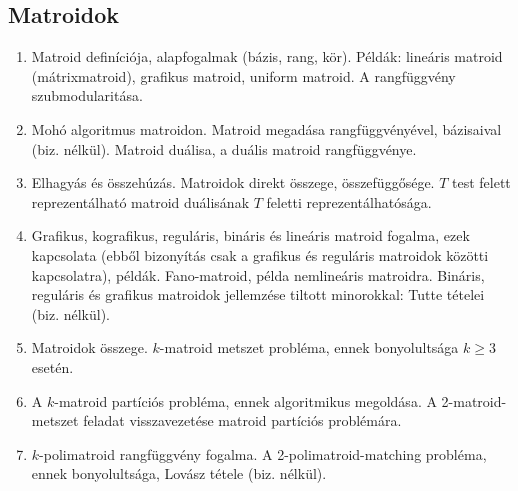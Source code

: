 \subsection*{Matroidok}
\begin{enumerate}[resume]
\item	Matroid definíciója, alapfogalmak (bázis, rang, kör). Példák: lineáris matroid (mátrixmatroid), grafikus matroid, uniform matroid. A rangfüggvény szubmodularitása.
\item	Mohó algoritmus matroidon. Matroid megadása rangfüggvényével, bázisaival (biz. nélkül). Matroid duálisa, a duális matroid rangfüggvénye.
\item	Elhagyás és összehúzás. Matroidok direkt összege, összefüggősége. $T$ test felett reprezentálható matroid duálisának $T$ feletti reprezentálhatósága.
\item	Grafikus, kografikus, reguláris, bináris és lineáris matroid fogalma, ezek kapcsolata (ebből bizonyítás csak a grafikus és reguláris matroidok közötti kapcsolatra), példák. Fano-matroid, példa nemlineáris matroidra. Bináris, reguláris és grafikus matroidok jellemzése tiltott minorokkal: Tutte tételei (biz. nélkül).
\item	Matroidok összege. $k$-matroid metszet probléma, ennek bonyolultsága $k\geq3$ esetén.
\item	A $k$-matroid partíciós probléma, ennek algoritmikus megoldása. A 2-matroid-metszet feladat visszavezetése matroid partíciós problémára.
\item	$k$-polimatroid rangfüggvény fogalma. A 2-polimatroid-matching probléma, ennek bonyolultsága, Lovász tétele (biz. nélkül).
\end{enumerate}

\vspace{3mm}
